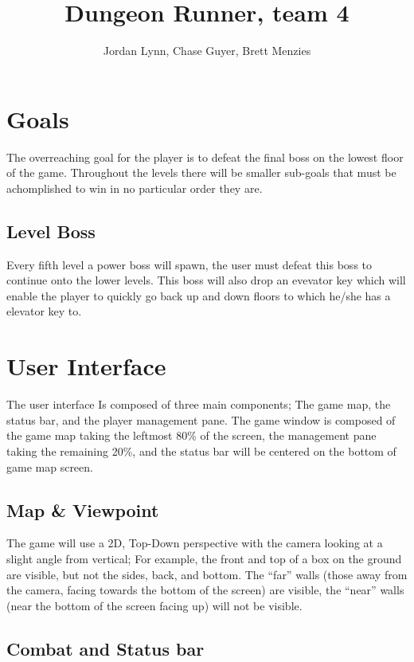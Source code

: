 \documentclass[11pt]{article}
\title{Dungeon Runner, team 4}
\author{Jordan Lynn, Chase Guyer, Brett Menzies}
\begin{document}
    \maketitle

    \section{Goals}
    The overreaching goal for the player is to defeat the final boss on the lowest floor of the game. Throughout the levels there will be smaller sub-goals that must be achomplished to win in no particular order they are.
        \subsection{Level Boss}
            Every fifth level a power boss will spawn, the user must defeat this boss to continue onto the lower levels. This boss will also drop an evevator key which will enable the player to quickly go back up and down floors to which he/she has a elevator key to.

    \section{}

    \section{User Interface}
        The user interface Is composed of three main components; The game map, the status bar, and the player management pane.
	The game window is composed of the game map taking the leftmost 80\% of the screen, the management pane taking the remaining 20\%, and the status bar will be centered on the bottom of game map screen.

	\subsection{Map \& Viewpoint}
	The game will use a 2D, Top-Down perspective with the camera looking at a slight angle from vertical; For example, the front and top of a box on the ground are visible, but not the sides, back, and bottom.
	The ``far'' walls (those away from the camera, facing towards the bottom of the screen) are visible, the ``near'' walls (near the bottom of the screen facing up) will not be visible.

	\subsection{Combat and Status bar}
\end{document}

